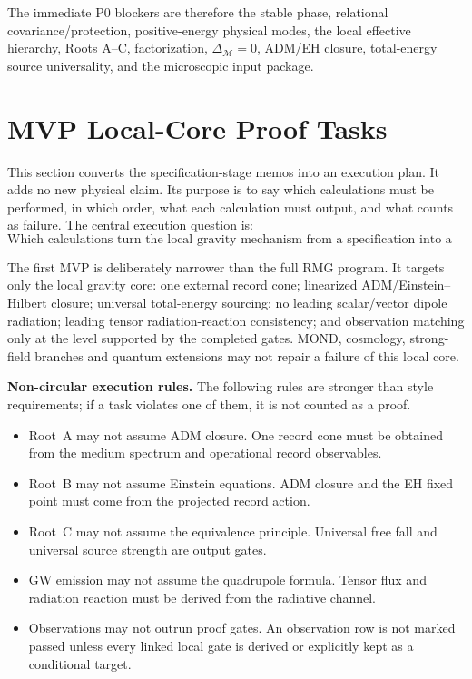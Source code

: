 \documentclass[11pt]{article}
\begin{document}
The immediate P0 blockers are therefore the stable phase, relational
covariance/protection, positive-energy physical modes, the local effective
hierarchy, Roots A--C, factorization, \(\Delta_{\mathcal M}=0\), ADM/EH
closure, total-energy source universality, and the microscopic input package.

\section{MVP Local-Core Proof Tasks}

This section converts the specification-stage memos into an execution plan.
It adds no new physical claim.  Its purpose is to say which calculations must
be performed, in which order, what each calculation must output, and what
counts as failure.  The central execution question is:
\[
\boxed{
\text{Which calculations turn the local gravity mechanism from a specification
into a proof attempt?}
}
\]

The first MVP is deliberately narrower than the full RMG program.  It targets
only the local gravity core: one external record cone; linearized
ADM/Einstein--Hilbert closure; universal total-energy sourcing; no leading
scalar/vector dipole radiation; leading tensor radiation-reaction
consistency; and observation matching only at the level supported by the
completed gates.  MOND, cosmology, strong-field branches and quantum
extensions may not repair a failure of this local core.

\medskip\noindent\textbf{Non-circular execution rules.}
The following rules are stronger than style requirements; if a task violates
one of them, it is not counted as a proof.
\begin{itemize}
\item Root~A may not assume ADM closure.  One record cone must be obtained from
  the medium spectrum and operational record observables.
\item Root~B may not assume Einstein equations.  ADM closure and the EH fixed
  point must come from the projected record action.
\item Root~C may not assume the equivalence principle.  Universal free fall and
  universal source strength are output gates.
\item GW emission may not assume the quadrupole formula.  Tensor flux and
  radiation reaction must be derived from the radiative channel.
\item Observations may not outrun proof gates.  An observation row is not
  marked passed unless every linked local gate is derived or explicitly kept
  as a conditional target.
\end{itemize}
\end{document}
